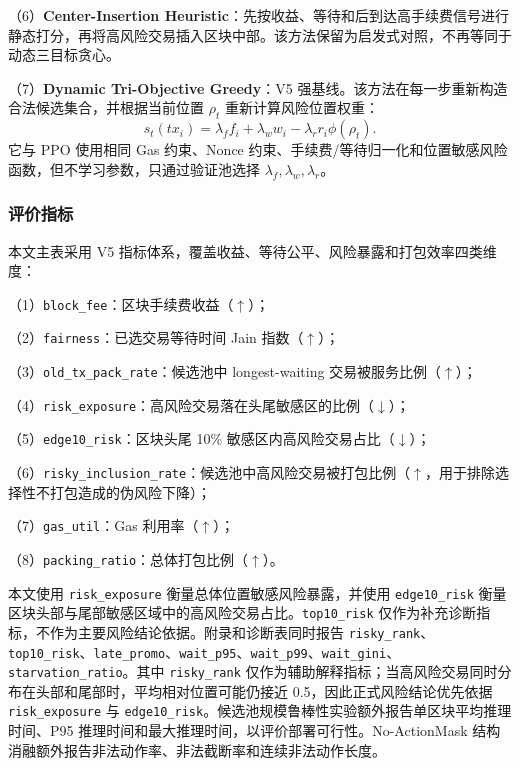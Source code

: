 （6）\textbf{Center-Insertion Heuristic}：先按收益、等待和后到达高手续费信号进行静态打分，再将高风险交易插入区块中部。该方法保留为启发式对照，不再等同于动态三目标贪心。

（7）\textbf{Dynamic Tri-Objective Greedy}：V5 强基线。该方法在每一步重新构造合法候选集合，并根据当前位置 $\rho_t$ 重新计算风险位置权重：
\begin{equation}
  s_t(tx_i)=\lambda_f f_i + \lambda_w w_i - \lambda_r r_i\phi(\rho_t).
\end{equation}
它与 PPO 使用相同 Gas 约束、Nonce 约束、手续费/等待归一化和位置敏感风险函数，但不学习参数，只通过验证池选择 $\lambda_f,\lambda_w,\lambda_r$。


\subsubsection{评价指标}

本文主表采用 V5 指标体系，覆盖收益、等待公平、风险暴露和打包效率四类维度：

（1）\texttt{block\_fee}：区块手续费收益（$\uparrow$）；

（2）\texttt{fairness}：已选交易等待时间 Jain 指数（$\uparrow$）；

（3）\texttt{old\_tx\_pack\_rate}：候选池中 longest-waiting 交易被服务比例（$\uparrow$）；

（4）\texttt{risk\_exposure}：高风险交易落在头尾敏感区的比例（$\downarrow$）；

（5）\texttt{edge10\_risk}：区块头尾 10\% 敏感区内高风险交易占比（$\downarrow$）；

（6）\texttt{risky\_inclusion\_rate}：候选池中高风险交易被打包比例（$\uparrow$，用于排除选择性不打包造成的伪风险下降）；

（7）\texttt{gas\_util}：Gas 利用率（$\uparrow$）；

（8）\texttt{packing\_ratio}：总体打包比例（$\uparrow$）。

本文使用 \texttt{risk\_exposure} 衡量总体位置敏感风险暴露，并使用 \texttt{edge10\_risk} 衡量区块头部与尾部敏感区域中的高风险交易占比。\texttt{top10\_risk} 仅作为补充诊断指标，不作为主要风险结论依据。附录和诊断表同时报告 \texttt{risky\_rank}、\texttt{top10\_risk}、\texttt{late\_promo}、\texttt{wait\_p95}、\texttt{wait\_p99}、\texttt{wait\_gini}、\texttt{starvation\_ratio}。其中 \texttt{risky\_rank} 仅作为辅助解释指标；当高风险交易同时分布在头部和尾部时，平均相对位置可能仍接近 0.5，因此正式风险结论优先依据 \texttt{risk\_exposure} 与 \texttt{edge10\_risk}。候选池规模鲁棒性实验额外报告单区块平均推理时间、P95 推理时间和最大推理时间，以评价部署可行性。No-ActionMask 结构消融额外报告非法动作率、非法截断率和连续非法动作长度。

